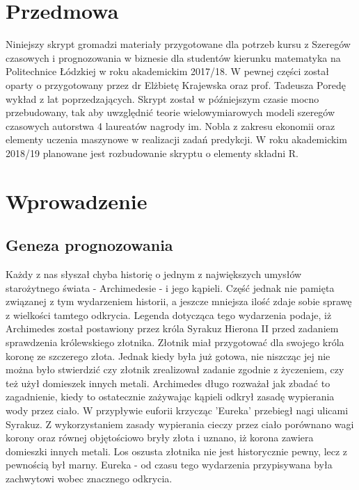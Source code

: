 \documentclass[10pt,a4paper]{book}
\begin{document}
\chapter*{Przedmowa}

Niniejszy skrypt gromadzi materiały przygotowane dla potrzeb kursu z Szeregów czasowych i prognozowania w biznesie dla studentów kierunku matematyka na Politechnice Łódzkiej w roku akademickim 2017/18. W pewnej części został oparty o przygotowany przez dr Elżbietę Krajewska oraz prof. Tadeusza Poredę wykład z lat poprzedzających. Skrypt został w późniejszym czasie mocno przebudowany, tak aby uwzględnić teorie wielowymiarowych modeli szeregów czasowych autorstwa 4 laureatów nagrody im. Nobla z zakresu ekonomii oraz elementy uczenia maszynowe w realizacji zadań predykcji. W roku akademickim 2018/19 planowane jest rozbudowanie skryptu o elementy składni R. 

\newpage
\tableofcontents

\chapter{Wprowadzenie}

\section{Geneza prognozowania}

Każdy z nas słyszał chyba historię o jednym z największych umysłów starożytnego świata - Archimedesie - i jego kąpieli. Część jednak nie pamięta związanej z tym wydarzeniem historii, a jeszcze mniejsza ilość zdaje sobie sprawę z wielkości tamtego odkrycia. Legenda dotycząca tego wydarzenia podaje, iż Archimedes został postawiony przez króla Syrakuz Hierona II przed zadaniem sprawdzenia królewskiego złotnika. Złotnik miał przygotować dla swojego króla koronę ze szczerego złota. Jednak kiedy była już gotowa, nie niszcząc jej nie można było stwierdzić czy złotnik zrealizował zadanie zgodnie z życzeniem, czy też użył domieszek innych metali. Archimedes długo rozważał jak zbadać to zagadnienie, kiedy to ostatecznie zażywając kąpieli odkrył zasadę wypierania wody przez ciało. W przypływie euforii krzycząc 'Eureka' przebiegł nagi ulicami Syrakuz. Z wykorzystaniem zasady wypierania cieczy przez ciało porównano wagi korony oraz równej objętościowo bryły złota i uznano, iż korona zawiera domieszki innych metali. Los oszusta złotnika nie jest historycznie pewny, lecz z pewnością był marny. Eureka - od czasu tego wydarzenia przypisywana była zachwytowi wobec znacznego odkrycia. 
\end{document}
